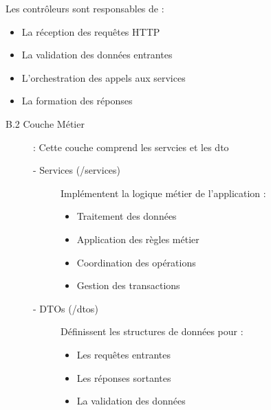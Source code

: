 \begin{enumerate}
\begin{description}
            Les contrôleurs sont responsables de :

            \begin{itemize}
                \item La réception des requêtes HTTP
                \item La validation des données entrantes
                \item L'orchestration des appels aux services
                \item La formation des réponses
            \end{itemize}

            \vspace{0.35cm}

            \begin{description}
                \item[B.2 Couche Métier] : 
                    Cette couche comprend les servcies et les dto 
                    \begin{description}
                        \item[- Services (/services)] 
                            Implémentent la logique métier de l'application :
                            
                            \begin{itemize}
                                \item Traitement des données
                                \item Application des règles métier
                                \item Coordination des opérations
                                \item Gestion des transactions
                            \end{itemize}

                        \vspace{0.35cm}
                        \item[- DTOs (/dtos)]
        
                            Définissent les structures de données pour :
                            
                            \begin{itemize}
                                \item Les requêtes entrantes
                                \item Les réponses sortantes
                                \item La validation des données
                            \end{itemize}
                    

\end{description}
\end{description}
\end{description}
\end{enumerate}
